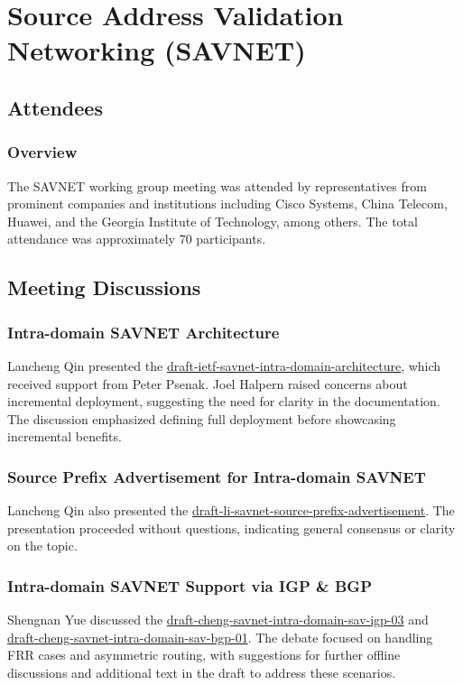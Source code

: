 \documentclass{article}
\begin{document}
\section{Source Address Validation Networking (SAVNET)}

\subsection{Attendees}
\subsubsection{Overview}
The SAVNET working group meeting was attended by representatives from prominent companies and institutions including Cisco Systems, China Telecom, Huawei, and the Georgia Institute of Technology, among others. The total attendance was approximately 70 participants.

\subsection{Meeting Discussions}

\subsubsection{Intra-domain SAVNET Architecture}
Lancheng Qin presented the \href{https://datatracker.ietf.org/doc/draft-ietf-savnet-intra-domain-architecture/}{draft-ietf-savnet-intra-domain-architecture}, which received support from Peter Psenak. Joel Halpern raised concerns about incremental deployment, suggesting the need for clarity in the documentation. The discussion emphasized defining full deployment before showcasing incremental benefits.

\subsubsection{Source Prefix Advertisement for Intra-domain SAVNET}
Lancheng Qin also presented the \href{https://datatracker.ietf.org/doc/draft-li-savnet-source-prefix-advertisement/}{draft-li-savnet-source-prefix-advertisement}. The presentation proceeded without questions, indicating general consensus or clarity on the topic.

\subsubsection{Intra-domain SAVNET Support via IGP \& BGP}
Shengnan Yue discussed the \href{https://datatracker.ietf.org/doc/draft-cheng-savnet-intra-domain-sav-igp-03}{draft-cheng-savnet-intra-domain-sav-igp-03} and \href{https://datatracker.ietf.org/doc/draft-cheng-savnet-intra-domain-sav-bgp-01}{draft-cheng-savnet-intra-domain-sav-bgp-01}. The debate focused on handling FRR cases and asymmetric routing, with suggestions for further offline discussions and additional text in the draft to address these scenarios.
\end{document}
